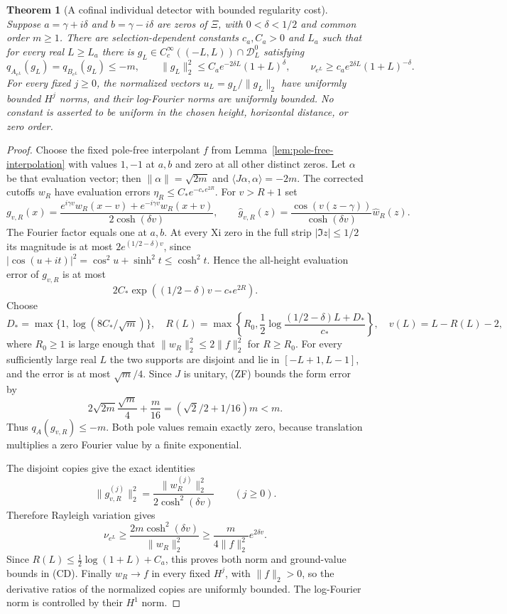 \documentclass[11pt]{article}
\newtheorem{theorem}{Theorem}
\theoremstyle{remark}\newtheorem{remark}[theorem]{Remark}
\begin{document}
\begin{theorem}[A cofinal individual detector with bounded regularity cost]
\label{thm:cofinal-detector}
Suppose $a=\gamma+i\delta$ and $b=\gamma-i\delta$ are zeros of
$\Xi$, with $0<\delta<1/2$ and common order $m\ge1$.
There are selection-dependent constants $c_a,C_a>0$ and $L_a$
such that for every real $L\ge L_a$ there is
$g_L\in C_c^\infty((-L,L))\cap\mathcal D_L^0$ satisfying
\[
 q_{A_{e^L}}(g_L)=q_{B_{e^L}}(g_L)\le-m,\qquad
 \|g_L\|_2^2\le C_a e^{-2\delta L}(1+L)^\delta,
 \qquad
 \nu_{e^L}\ge c_a e^{2\delta L}(1+L)^{-\delta}.            \tag{CD}
\]
For every fixed $j\ge0$, the normalized vectors
$u_L=g_L/\|g_L\|_2$ have uniformly bounded $H^j$ norms,
and their log-Fourier norms are uniformly bounded.
No constant is asserted to be uniform in the chosen height,
horizontal distance, or zero order.
\end{theorem}
\begin{proof}
Choose the fixed pole-free interpolant $f$ from
Lemma~\ref{lem:pole-free-interpolation} with values $1,-1$
at $a,b$ and zero at all other distinct zeros.
Let $\alpha$ be that evaluation vector; then
$\|\alpha\|=\sqrt{2m}$ and $\langle J\alpha,\alpha\rangle=-2m$.
The corrected cutoffs $w_R$ have evaluation errors
$\eta_R\le C_*e^{-c_*e^{2R}}$.
For $v>R+1$ set
\[
 g_{v,R}(x)=
 \frac{e^{i\gamma v}w_R(x-v)+e^{-i\gamma v}w_R(x+v)}
                       {2\cosh(\delta v)},\qquad
 \widehat g_{v,R}(z)=
 \frac{\cos(v(z-\gamma))}{\cosh(\delta v)}\widehat w_R(z).
                                                               \tag{SC}
\]
The Fourier factor equals one at $a,b$.
At every Xi zero in the full strip $|\Im z|\le1/2$ its magnitude
is at most $2e^{(1/2-\delta)v}$, since
$|\cos(u+it)|^2=\cos^2u+\sinh^2t\le\cosh^2t$.
Hence the all-height evaluation error of $g_{v,R}$ is at most
\[
 2C_*\exp((1/2-\delta)v-c_*e^{2R}).
\]
Choose
\[
 D_*=\max\{1,\log(8C_*/\sqrt m)\},\quad
 R(L)=\max\left\{R_0,\frac12\log
                 \frac{(1/2-\delta)L+D_*}{c_*}\right\},\quad
 v(L)=L-R(L)-2,
\]
where $R_0\ge1$ is large enough that
$\|w_R\|_2^2\le2\|f\|_2^2$ for $R\ge R_0$.
For every sufficiently large real $L$ the two supports are
disjoint and lie in $[-L+1,L-1]$, and the error is at most
$\sqrt m/4$. Since $J$ is unitary, (ZF) bounds the form error by
\[
 2\sqrt{2m}\frac{\sqrt m}{4}+\frac m{16}
             =(\sqrt2/2+1/16)m<m.
\]
Thus $q_A(g_{v,R})\le-m$. Both pole values remain exactly zero,
because translation multiplies a zero Fourier value by a finite
exponential.

The disjoint copies give the exact identities
\[
 \|g_{v,R}^{(j)}\|_2^2
             =\frac{\|w_R^{(j)}\|_2^2}{2\cosh^2(\delta v)}
                       \qquad(j\ge0).
\]
Therefore Rayleigh variation gives
\[
 \nu_{e^L}\ge
 \frac{2m\cosh^2(\delta v)}{\|w_R\|_2^2}
       \ge\frac{m}{4\|f\|_2^2}e^{2\delta v}.
\]
Since $R(L)\le\frac12\log(1+L)+C_a$, this proves both norm
and ground-value bounds in (CD). Finally $w_R\to f$ in every
fixed $H^j$, with $\|f\|_2>0$, so the derivative ratios of the
normalized copies are uniformly bounded. The log-Fourier norm
is controlled by their $H^1$ norm.
\end{proof}
\end{document}
